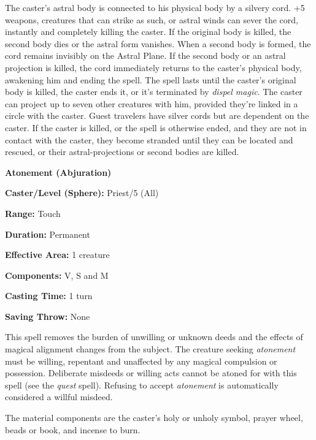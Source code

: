 \begin{multicols}{2}
The caster's astral body is connected to his physical body by a silvery cord.  +5 weapons, creatures that can strike as such, or astral winds can sever the cord, instantly and completely killing the caster.  If the original body is killed, the second body dies or the astral form vanishes.  When a second body is formed, the cord remains invisibly on the Astral Plane.  If the second body or an astral projection is killed, the cord immediately returns to the caster's physical body, awakening him and ending the spell.  
The spell lasts until the caster's original body is killed, the caster ends it, or it's terminated by \textit{dispel magic}.  The caster can project up to seven other creatures with him, provided they're linked in a circle with the caster.  Guest travelers have silver cords but are dependent on the caster.  If the caster is killed, or the spell is otherwise ended, and they are not in contact with the caster, they become stranded until they can be located and rescued, or their astral-projections or second bodies are killed.

\vspace{1em}

\noindent
\begin{minipage}{\columnwidth}

\noindent \textbf{Atonement (Abjuration)}

\noindent \textbf{Caster/Level (Sphere):} Priest/5 (All)

\noindent \textbf{Range:} Touch

\noindent \textbf{Duration:} Permanent

\noindent \textbf{Effective Area:} 1 creature

\noindent \textbf{Components:} V, S and M

\noindent \textbf{Casting Time:} 1 turn

\noindent \textbf{Saving Throw:} None

\end{minipage}

This spell removes the burden of unwilling or unknown deeds and the effects of magical alignment changes from the subject.  The creature seeking \textit{atonement} must be willing, repentant and unaffected by any magical compulsion or possession.  Deliberate misdeeds or willing acts cannot be atoned for with this spell (see the \textit{quest} spell).  Refusing to accept \textit{atonement} is automatically considered a willful misdeed.

The material components are the caster's holy or unholy symbol, prayer wheel, beads or book, and incense to burn.


\end{multicols}
